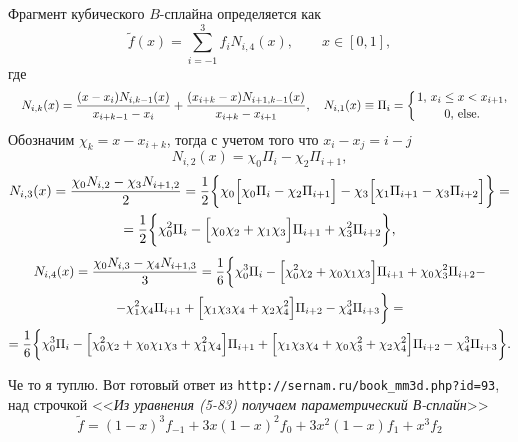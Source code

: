 Фрагмент кубического $B$-сплайна определяется как
$$
\widetilde f(x) = \sum_{i=-1}^3 f_i N_{i,4}(x),\qquad x\in[0,1],
$$
где
$$
\quad N_{i,k}(x) = \frac{(x-x_i)N_{i,k-1}(x)}{x_{i+k-1}-x_i} + \frac{(x_{i+k}-x)N_{i+1,k-1}(x)}{x_{i+k}-x_{i+1}},
\quad N_{i,1}(x) \equiv \Pi_i = \left\{{1,\,x_i\le x<x_{i+1},\atop 0,\,\rm else. }\right.
$$
Обозначим $\chi_k=x-x_{i+k}$, тогда с учетом того что $x_i-x_j=i-j$
$$
N_{i,2}(x) = \chi_0\Pi_i - \chi_2\Pi_{i+1},
$$
\begin{multline}
  N_{i,3}(x) = \frac{\chi_0 N_{i,2} -\chi_3 N_{i+1,2}}2
  =\frac12\bigg\{\chi_0\Big[\chi_0\Pi_i -\chi_2\Pi_{i+1}\Big] -\chi_3\Big[\chi_1\Pi_{i+1} -\chi_3\Pi_{i+2}\Big]\bigg\}
  =\\=\frac12\bigg\{\chi_0^2 \Pi_i - \Big[\chi_0\chi_2 + \chi_1\chi_3\Big]\Pi_{i+1} +\chi_3^2\Pi_{i+2}\bigg\},
  \notag
\end{multline}
\begin{multline}
  N_{i,4}(x) = \frac{\chi_0 N_{i,3} -\chi_4 N_{i+1,3}}3 =\frac16\bigg\{\chi_0^3 \Pi_i - \Big[\chi_0^2\chi_2 + \chi_0\chi_1\chi_3\Big]\Pi_{i+1} +\chi_0\chi_3^2\Pi_{i+2}
  -\\-\chi_1^2\chi_4 \Pi_{i+1} + \Big[\chi_1\chi_3\chi_4 + \chi_2\chi_4^2\Big]\Pi_{i+2} -\chi_4^3\Pi_{i+3}
  \bigg\}=\\=
\frac16\bigg\{\chi_0^3 \Pi_i - \Big[\chi_0^2\chi_2 + \chi_0\chi_1\chi_3 + \chi_1^2\chi_4 \Big]\Pi_{i+1} 
  +\Big[\chi_1\chi_3\chi_4 + \chi_0\chi_3^2 + \chi_2\chi_4^2\Big]\Pi_{i+2} -\chi_4^3\Pi_{i+3}
  \bigg\}.  \notag
\end{multline}

Че то я туплю. Вот готовый ответ из \verb'http://sernam.ru/book_mm3d.php?id=93', над строчкой <<{\it Из уравнения (5-83) получаем параметрический В-сплайн}>>
$$
\widetilde f = (1-x)^3f_{-1} + 3x(1-x)^2 f_0 + 3x^2(1-x) f_1 + x^3 f_2
$$
